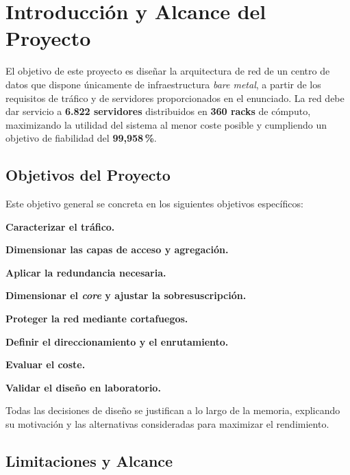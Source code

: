 \section{Introducción y Alcance del Proyecto}
\label{sec:introduccion}

El objetivo de este proyecto es diseñar la arquitectura de red de un centro de
datos que dispone únicamente de infraestructura \textit{bare metal}, a partir
de los requisitos de tráfico y de servidores proporcionados en el enunciado.
La red debe dar servicio a \textbf{6.822 servidores} distribuidos en
\textbf{360 racks} de cómputo, maximizando la utilidad del sistema al menor coste
posible y cumpliendo un objetivo de fiabilidad del \textbf{99,958\,\%}.

\subsection{Objetivos del Proyecto}
\label{subsec:objetivos}

Este objetivo general se concreta en los siguientes objetivos específicos:

\begin{tight-list}
    \setlength{\itemsep}{0pt}
    \setlength{\topsep}{2pt}
    \setlength{\parsep}{0pt}
    \item \textbf{Caracterizar el tráfico.}
    \item \textbf{Dimensionar las capas de acceso y agregación.}
    \item \textbf{Aplicar la redundancia necesaria.}
    \item \textbf{Dimensionar el \textit{core} y ajustar la sobresuscripción.}
    \item \textbf{Proteger la red mediante cortafuegos.}
    \item \textbf{Definir el direccionamiento y el enrutamiento.}
    \item \textbf{Evaluar el coste.}
    \item \textbf{Validar el diseño en laboratorio.}
\end{tight-list}

Todas las decisiones de diseño se justifican a lo largo de la memoria,
explicando su motivación y las alternativas consideradas para maximizar el rendimiento.

\subsection{Limitaciones y Alcance}
\label{subsec:limitaciones}

